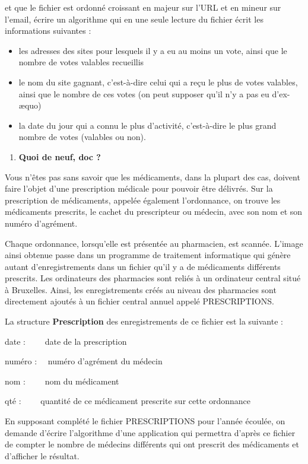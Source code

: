 {
et que le fichier est ordonné croissant en majeur sur
l'URL et en mineur sur l'email,
écrire un algorithme qui en une seule lecture du fichier écrit les
informations suivantes :}


\bigskip

\liststyleListv
\begin{itemize}
\item {
les adresses des sites pour lesquels il y a eu au moins un vote, ainsi
que le nombre de votes valables recueillis }
\item {
le nom du site gagnant, c’est-à-dire celui qui a reçu le plus de votes
valables, ainsi que le nombre de ces votes (on peut supposer qu’il n’y
a pas eu d’ex-æquo)}
\item {
la date du jour qui a connu le plus d’activité, c’est-à-dire le plus
grand nombre de votes (valables ou non).}
\end{itemize}
\liststyleExercice
\begin{enumerate}
\item {\sffamily\bfseries
Quoi de neuf, doc ?}
\end{enumerate}
{
Vous n’êtes pas sans savoir que les médicaments, dans la plupart des
cas, doivent faire l’objet d’une prescription médicale pour pouvoir
être délivrés. Sur la prescription de médicaments, appelée également
l’ordonnance, on trouve les médicaments prescrits, le cachet du
prescripteur ou médecin, avec son nom et son numéro d’agrément. }

{
Chaque ordonnance, lorsqu’elle est présentée au pharmacien, est scannée.
L’image ainsi obtenue passe dans un programme de traitement
informatique qui génère autant d’enregistrements dans un fichier qu’il
y a de médicaments différents prescrits. Les ordinateurs des pharmacies
sont reliés à un ordinateur central situé à Bruxelles. Ainsi, les
enregistrements créés au niveau des pharmacies sont directement ajoutés
à un fichier central annuel appelé PRESCRIPTIONS. }

{
La structure \textbf{Prescription} des enregistrements de ce fichier est
la suivante :}

{
date : \ \ \ \ date de la prescription}

{
numéro : \ \ numéro d’agrément du médecin}

{
nom : \ \ \ \ nom du médicament}

{
qté : \ \ \ \ quantité de ce médicament prescrite sur cette ordonnance}

{
En supposant complété le fichier PRESCRIPTIONS pour l’année écoulée, on
demande d’écrire l’algorithme d’une application qui permettra d’après
ce fichier de compter le nombre de médecins différents qui ont prescrit
des médicaments et d’afficher le résultat. }


